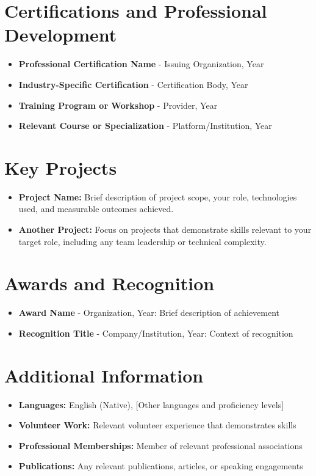 \documentclass[11pt,a4paper]{article}
\begin{document}
\section{Certifications and Professional Development}
\begin{itemize}[leftmargin=*]
    \item \textbf{Professional Certification Name} - Issuing Organization, Year
    \item \textbf{Industry-Specific Certification} - Certification Body, Year
    \item \textbf{Training Program or Workshop} - Provider, Year
    \item \textbf{Relevant Course or Specialization} - Platform/Institution, Year
\end{itemize}

\section{Key Projects}
\begin{itemize}[leftmargin=*]
    \item \textbf{Project Name:} Brief description of project scope, your role, technologies used, and measurable outcomes achieved.
    \item \textbf{Another Project:} Focus on projects that demonstrate skills relevant to your target role, including any team leadership or technical complexity.
\end{itemize}

\section{Awards and Recognition}
\begin{itemize}[leftmargin=*]
    \item \textbf{Award Name} - Organization, Year: Brief description of achievement
    \item \textbf{Recognition Title} - Company/Institution, Year: Context of recognition
\end{itemize}

\section{Additional Information}
\begin{itemize}[leftmargin=*]
    \item \textbf{Languages:} English (Native), [Other languages and proficiency levels]
    \item \textbf{Volunteer Work:} Relevant volunteer experience that demonstrates skills
    \item \textbf{Professional Memberships:} Member of relevant professional associations
    \item \textbf{Publications:} Any relevant publications, articles, or speaking engagements
\end{itemize}
\end{document}
